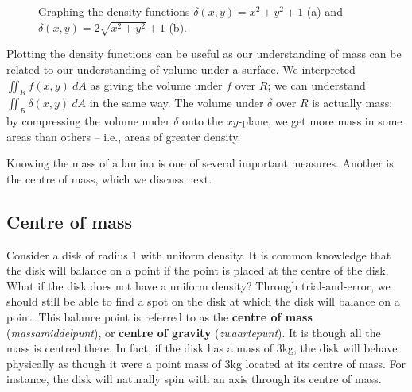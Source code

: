 \begin{figure}
\centering
\qquad
{}
\caption{Graphing the density functions  $\delta(x,y) = x^2+y^2+1$ (a) and $\delta(x,y) = 2\sqrt{x^2+y^2}+1$ (b).}
\label{fig_multiple_18}
\end{figure}

Plotting the density functions can be useful as our understanding of mass can be related to our understanding of volume under a surface. We interpreted $\iint_R f(x,y)\ dA$ as giving the volume under $f$ over $R$; we can understand $\iint_R\delta(x,y)\ dA$ in the same way. The volume under $\delta$ over $R$ is actually mass; by compressing the volume under $\delta$ onto the $xy$-plane, we get more mass in some areas than others -- i.e., areas of greater density.

Knowing the mass of a lamina is one of several important measures. Another is the centre of mass, which we discuss next.

\subsection{Centre of mass}

Consider a disk of radius 1 with uniform density. It is common knowledge that the disk will balance on a point if the point is placed at the centre of the disk. What if the disk does not have a uniform density? Through trial-and-error, we should still be able to find a spot on the disk at which the disk will balance on a point. This balance point is referred to as the \textbf{centre of mass} (\textit{massamiddelpunt}), or \textbf{centre of gravity} (\textit{zwaartepunt}). It is though all the mass is centred there. In fact, if the disk has a mass of 3kg, the disk will behave physically as though it were a point mass of 3kg located at its centre of mass. For instance, the disk will naturally spin with an axis through its centre of mass.

